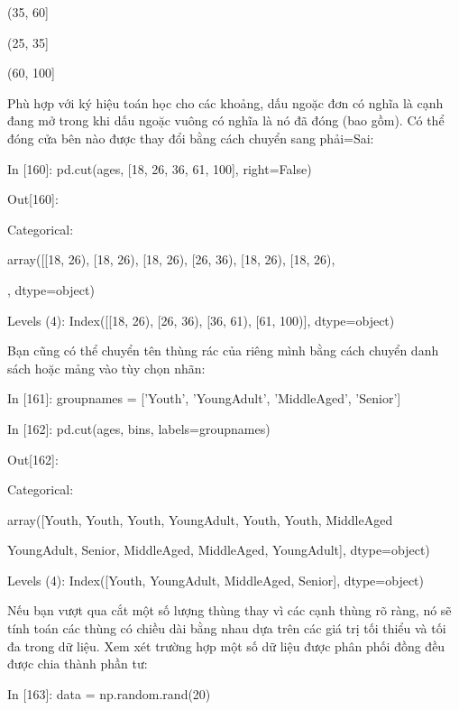     \quad\textup{(35, 60]    }\par
    \quad\textup{(25, 35]    }\par
    \quad\textup{(60, 100] }\par
Phù hợp với ký hiệu toán học cho các khoảng, dấu ngoặc đơn có nghĩa là cạnh 
đang mở trong khi dấu ngoặc vuông có nghĩa là nó đã đóng (bao gồm). Có thể đóng cửa bên nào 
được thay đổi bằng cách chuyển sang phải=Sai:\par
    \quad\textup{In [160]: pd.cut(ages, [18, 26, 36, 61, 100], right=False)  }\par
    \quad\textup{Out[160]:  }\par
    \quad\textup{Categorical:   }\par 
    \quad\textup{array([[18, 26), [18, 26), [18, 26), [26, 36), [18, 26), [18, 26), }\par
    \quad\textup{\quad\quad [36, 61), [26, 36), [61, 100), [36, 61), [36, 61), [26, 36)], dtype=object)   }\par
    \quad\textup{Levels (4): Index([[18, 26), [26, 36), [36, 61), [61, 100)], dtype=object)}\par
Bạn cũng có thể chuyển tên thùng rác của riêng mình bằng cách chuyển danh sách hoặc mảng vào tùy chọn nhãn:\par
    \quad\textup{In [161]: group\textunderscore names = ['Youth', 'YoungAdult', 'MiddleAged', 'Senior'] }\par
    \quad\textup{In [162]: pd.cut(ages, bins, labels=group\textunderscore names)  }\par
    \quad\textup{Out[162]: }\par
    \quad\textup{Categorical:   }\par
    \quad\textup{array([Youth, Youth, Youth, YoungAdult, Youth, Youth, MiddleAged}\par
    \quad\textup{\quad\quad YoungAdult, Senior, MiddleAged, MiddleAged, YoungAdult], dtype=object)    }\par
    \quad\textup{Levels (4): Index([Youth, YoungAdult, MiddleAged, Senior], dtype=object)}\par
Nếu bạn vượt qua cắt một số lượng thùng thay vì các cạnh thùng rõ ràng, nó sẽ tính toán 
các thùng có chiều dài bằng nhau dựa trên các giá trị tối thiểu và tối đa trong dữ liệu. Xem xét 
trường hợp một số dữ liệu được phân phối đồng đều được chia thành phần tư:\par
    \quad\textup{In [163]: data = np.random.rand(20) }\par
